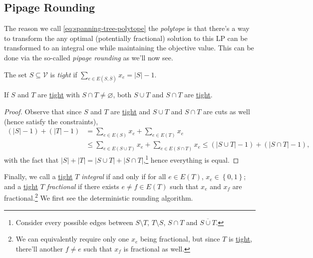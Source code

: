 \subsection{Pipage Rounding}
The reason we call \autoref{eq:spanning-tree-polytope} the \emph{polytope} is that there's a way to transform the any optimal (potentially fractional) solution to this LP can be transformed to an integral one while maintaining the objective value. This can be done via the so-called \emph{pipage rounding} as we'll now see.

\begin{notation}[Tight]\label{not:tight}
	The set \(S\subseteq \mathcal{V} \) is \emph{tight} if \(\sum_{e\in E(S, \overline{S})} x_e = \left\vert S \right\vert - 1 \).
\end{notation}

\begin{lemma}[Uncrossing]\label{lma:uncrossing}
	If \(S\) and \(T\) are \hyperref[not:tight]{\hyperref[not:tight]{tight}} with \(S \cap T \neq \varnothing \), both \(S \cup T\) and \(S \cap T\) are \hyperref[not:tight]{tight}.
\end{lemma}
\begin{proof}
	Observe that since \(S\) and \(T\) are \hyperref[not:tight]{tight} and \(S\cup T\) and \(S \cap T\) are cuts as well (hence satisfy the constraints),
	\[
		\begin{split}
			(\left\vert S \right\vert - 1) + (\left\vert T \right\vert - 1)
			&= \sum_{e\in E(S)}x_e + \sum_{e\in E(T)} x_e\\
			&\leq \sum_{e\in E(S \cup T)}x_e  + \sum_{e\in E (S \cap T)} x_e
			\leq (\left\vert S \cup T \right\vert - 1) + ( \left\vert S \cap T \right\vert - 1),
		\end{split}
	\]
	with the fact that \(\left\vert S \right\vert + \left\vert T \right\vert = \left\vert S \cup T \right\vert + \left\vert S \cap T \right\vert\),\footnote{Consider every possible edges between \(S\setminus T\), \(T\setminus S\), \(S \cap T\) and \(\overline{S \cup T}\).} hence everything is equal.
\end{proof}

Finally, we call a \hyperref[not:tight]{tight} \(T\) \emph{integral} if and only if for all \(e\in E(T)\), \(x_e\in \left\{ 0, 1 \right\} \); and a \hyperref[not:tight]{tight} \(T\) \emph{fractional} if there exists \(e \neq f\in E(T)\) such that \(x_e\) and \(x_f\) are fractional.\footnote{We can equivalently require only one \(x_e\) being fractional, but since \(T\) is \hyperref[not:tight]{tight}, there'll another \(f \neq e\) such that \(x_f\) is fractional as well.} We first see the deterministic rounding algorithm.

